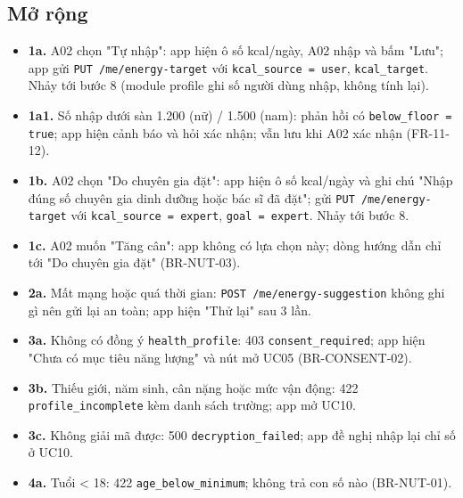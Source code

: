 \subsection{Mở rộng}
\begin{itemize}
\item \textbf{1a.} A02 chọn "Tự nhập": app hiện ô số kcal/\allowbreak{}ngày, A02 nhập và bấm "Lưu"; app gửi {\small\texttt{PUT /\allowbreak{}\allowbreak{}me/\allowbreak{}\allowbreak{}energy-\allowbreak{}target}} với {\small\texttt{kcal\_\allowbreak{}\allowbreak{}source = user}}, {\small\texttt{kcal\_\allowbreak{}\allowbreak{}target}}. Nhảy tới bước 8 (module profile ghi số người dùng nhập, không tính lại).
\item \textbf{1a1.} Số nhập dưới sàn 1.200 (nữ) /\allowbreak{} 1.500 (nam): phản hồi có {\small\texttt{below\_\allowbreak{}\allowbreak{}floor = true}}; app hiện cảnh báo và hỏi xác nhận; vẫn lưu khi A02 xác nhận (FR-\allowbreak{}11-\allowbreak{}12).
\item \textbf{1b.} A02 chọn "Do chuyên gia đặt": app hiện ô số kcal/\allowbreak{}ngày và ghi chú "Nhập đúng số chuyên gia dinh dưỡng hoặc bác sĩ đã đặt"; gửi {\small\texttt{PUT /\allowbreak{}\allowbreak{}me/\allowbreak{}\allowbreak{}energy-\allowbreak{}target}} với {\small\texttt{kcal\_\allowbreak{}\allowbreak{}source = expert}}, {\small\texttt{goal = expert}}. Nhảy tới bước 8.
\item \textbf{1c.} A02 muốn "Tăng cân": app không có lựa chọn này; dòng hướng dẫn chỉ tới "Do chuyên gia đặt" (BR-\allowbreak{}NUT-\allowbreak{}03).
\item \textbf{2a.} Mất mạng hoặc quá thời gian: {\small\texttt{POST /\allowbreak{}\allowbreak{}me/\allowbreak{}\allowbreak{}energy-\allowbreak{}suggestion}} không ghi gì nên gửi lại an toàn; app hiện "Thử lại" sau 3 lần.
\item \textbf{3a.} Không có đồng ý {\small\texttt{health\_\allowbreak{}\allowbreak{}profile}}: 403 {\small\texttt{consent\_\allowbreak{}\allowbreak{}required}}; app hiện "Chưa có mục tiêu năng lượng" và nút mở UC05 (BR-\allowbreak{}CONSENT-\allowbreak{}02).
\item \textbf{3b.} Thiếu giới, năm sinh, cân nặng hoặc mức vận động: 422 {\small\texttt{profile\_\allowbreak{}\allowbreak{}incomplete}} kèm danh sách trường; app mở UC10.
\item \textbf{3c.} Không giải mã được: 500 {\small\texttt{decryption\_\allowbreak{}\allowbreak{}failed}}; app đề nghị nhập lại chỉ số ở UC10.
\item \textbf{4a.} Tuổi < 18: 422 {\small\texttt{age\_\allowbreak{}\allowbreak{}below\_\allowbreak{}\allowbreak{}minimum}}; không trả con số nào (BR-\allowbreak{}NUT-\allowbreak{}01).

\end{itemize}

